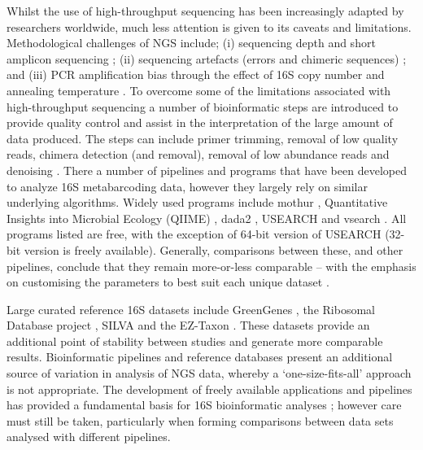 \documentclass[a4paper, nobind]{templates/ociamthesis}
\begin{document}
Whilst the use of high-throughput sequencing has been increasingly adapted by researchers worldwide, much less attention is given to its caveats and limitations. Methodological challenges of NGS include; (i) sequencing depth and short amplicon sequencing \autocite{gihringMassivelyParallelRRNA2012,houImpactNextgenerationSequencing2013,simsSequencingDepthCoverage2014}; (ii) sequencing artefacts (errors and chimeric sequences) \autocite{kuninWrinklesRareBiosphere2010,haasChimeric16SRRNA2011}; and (iii) PCR amplification bias through the effect of 16S copy number \autocite{ahnEffectsPCRCycle2012} and annealing temperature \autocite{suzukiBiasCausedTemplate1996}.
To overcome some of the limitations associated with high-throughput sequencing a number of bioinformatic steps are introduced to provide quality control and assist in the interpretation of the large amount of data produced.
The steps can include primer trimming, removal of low quality reads, chimera detection (and removal), removal of low abundance reads and denoising \autocite{edgarSearchClusteringOrders2010,kuninWrinklesRareBiosphere2010,haasChimeric16SRRNA2011,edgarUNOISE2ImprovedErrorcorrection2016}.
There a number of pipelines and programs that have been developed to analyze 16S metabarcoding data, however they largely rely on similar underlying algorithms.
Widely used programs include mothur \autocite{schlossIntroducingMothurOpensource2009}, Quantitative Insights into Microbial Ecology (QIIME) \autocite{caporasoQIIMEAllowsAnalysis2010}, dada2 \autocite{callahanDADA2HighresolutionSample2016}, USEARCH \autocite{edgarSearchClusteringOrders2010} and vsearch \autocite{rognesVSEARCHVersatileOpen2016}.
All programs listed are free, with the exception of 64-bit version of USEARCH (32-bit version is freely available).
Generally, comparisons between these, and other pipelines, conclude that they remain more-or-less comparable -- with the emphasis on customising the parameters to best suit each unique dataset \autocite{nilakantaReviewSoftwareAnalyzing2014,plummerComparisonThreeBioinformatics2015,forsterComparisonThreeClustering2016}.

Large curated reference 16S datasets include GreenGenes \autocite{desantisGreengenesChimerachecked16S2006}, the Ribosomal Database project \autocite{coleRibosomalDatabaseProject2009}, SILVA \autocite{pruesseSILVAComprehensiveOnline2007} and the EZ-Taxon \autocite{chunEzTaxonWebbasedTool2007}.
These datasets provide an additional point of stability between studies and generate more comparable results.
Bioinformatic pipelines and reference databases present an additional source of variation in analysis of NGS data, whereby a `one-size-fits-all' approach is not appropriate.
The development of freely available applications and pipelines has provided a fundamental basis for 16S bioinformatic analyses \autocite{schlossIntroducingMothurOpensource2009,caporasoQIIMEAllowsAnalysis2010,edgarSearchClusteringOrders2010}; however care must still be taken, particularly when forming comparisons between data sets analysed with different pipelines.
\end{document}
